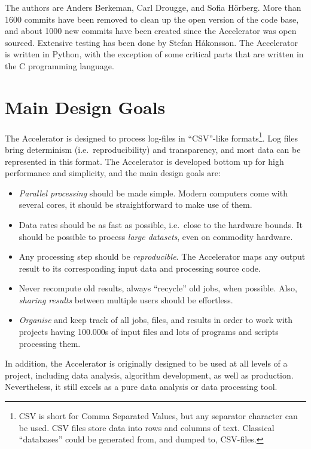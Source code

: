 The authors are Anders Berkeman, Carl Drougge, and Sofia H\"orberg.
More than 1600 commits have been removed to clean up the open version
of the code base, and about 1000 new commits have been created since
the Accelerator was open sourced.  Extensive testing has been done by
Stefan H{\aa}konsson.  The Accelerator is written in Python, with the
exception of some critical parts that are written in the C programming
language.



\section{Main Design Goals}
The Accelerator is designed to process log-files in ``CSV''-like
formats\footnote{CSV is short for Comma Separated Values, but any
separator character can be used.  CSV files store data into rows and
columns of text.  Classical ``databases'' could be generated from, and
dumped to, CSV-files.}.  Log files bring determinism (i.e.\
reproducibility) and transparency, and most data can be represented in
this format.  The Accelerator is developed bottom up for high
performance and simplicity, and the main design goals are:
\begin{itemize}

\item[] \textsl{Parallel processing} should be made simple.  Modern computers
  come with several cores, it should be straightforward to make use of
  them.

\item[] Data rates should be as fast as possible, i.e.\ close to the hardware
bounds.  It should be possible to process \textsl{large datasets},
  even on commodity hardware.

\item[] Any processing step should be \textsl{reproducible}.
The Accelerator maps any output result to its corresponding input data and
processing source code.

\item[] Never recompute old results, always ``recycle'' old jobs, when
  possible.  Also, \textsl{sharing results} between multiple users should be
  effortless.

\item[] \textsl{Organise} and keep track of all jobs, files, and results in
  order to work with projects having 100.000s of input files and lots
  of programs and scripts processing them.
  
\end{itemize}
In addition, the Accelerator is originally designed to be used at all
levels of a project, including data analysis, algorithm development,
as well as production.  Nevertheless, it still excels as a pure data
analysis or data processing tool.
